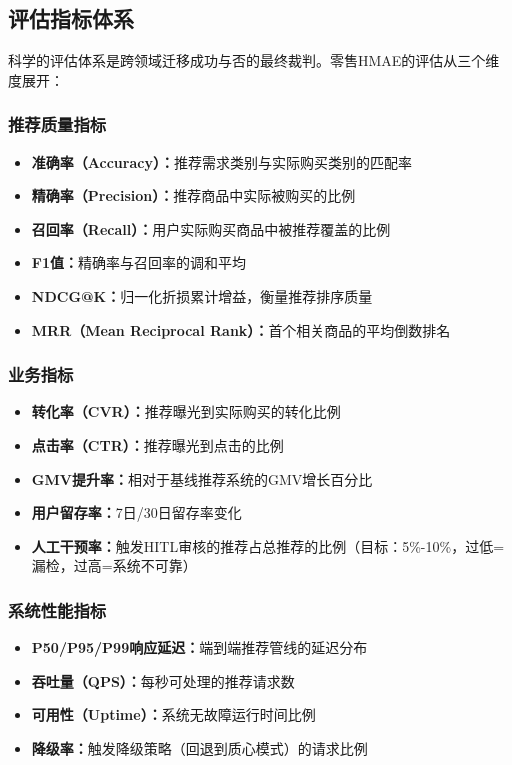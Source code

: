 \documentclass[11pt,a4paper]{ctexart}
\theoremstyle{remark}
\begin{document}
\subsection{评估指标体系}

科学的评估体系是跨领域迁移成功与否的最终裁判。零售HMAE的评估从三个维度展开：

\subsubsection{推荐质量指标}

\begin{itemize}[nosep]
\item \textbf{准确率（Accuracy）：}推荐需求类别与实际购买类别的匹配率
\item \textbf{精确率（Precision）：}推荐商品中实际被购买的比例
\item \textbf{召回率（Recall）：}用户实际购买商品中被推荐覆盖的比例
\item \textbf{F1值：}精确率与召回率的调和平均
\item \textbf{NDCG@K：}归一化折损累计增益，衡量推荐排序质量
\item \textbf{MRR（Mean Reciprocal Rank）：}首个相关商品的平均倒数排名
\end{itemize}

\subsubsection{业务指标}

\begin{itemize}[nosep]
\item \textbf{转化率（CVR）：}推荐曝光到实际购买的转化比例
\item \textbf{点击率（CTR）：}推荐曝光到点击的比例
\item \textbf{GMV提升率：}相对于基线推荐系统的GMV增长百分比
\item \textbf{用户留存率：}7日/30日留存率变化
\item \textbf{人工干预率：}触发HITL审核的推荐占总推荐的比例（目标：5\%-10\%，过低=漏检，过高=系统不可靠）
\end{itemize}

\subsubsection{系统性能指标}

\begin{itemize}[nosep]
\item \textbf{P50/P95/P99响应延迟：}端到端推荐管线的延迟分布
\item \textbf{吞吐量（QPS）：}每秒可处理的推荐请求数
\item \textbf{可用性（Uptime）：}系统无故障运行时间比例
\item \textbf{降级率：}触发降级策略（回退到质心模式）的请求比例
\end{itemize}
\end{document}
